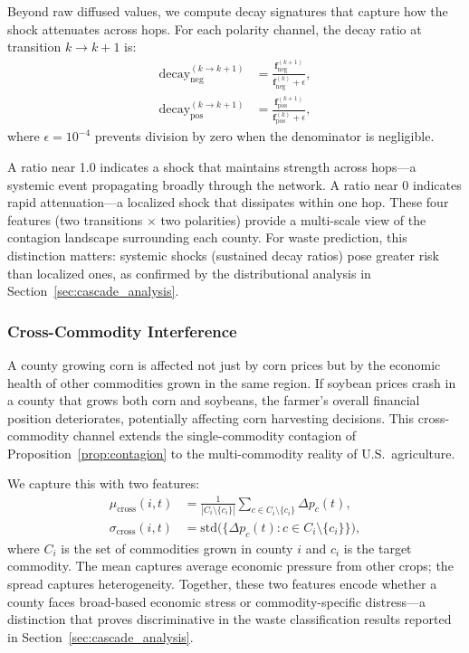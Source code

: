 \documentclass[preprint,12pt,authoryear]{elsarticle}
\begin{document}
Beyond raw diffused values, we compute decay signatures that capture how the shock attenuates across hops. For each polarity channel, the decay ratio at transition $k \to k{+}1$ is:
\begin{align}
    \text{decay}_{\text{neg}}^{(k \to k+1)} &= \frac{\mathbf{f}_{\text{neg}}^{(k+1)}}{\mathbf{f}_{\text{neg}}^{(k)} + \epsilon}, \label{eq:neg_decay}\\
    \text{decay}_{\text{pos}}^{(k \to k+1)} &= \frac{\mathbf{f}_{\text{pos}}^{(k+1)}}{\mathbf{f}_{\text{pos}}^{(k)} + \epsilon}, \label{eq:pos_decay}
\end{align}
where $\epsilon = 10^{-4}$ prevents division by zero when the denominator is negligible.

A ratio near 1.0 indicates a shock that maintains strength across hops---a systemic event propagating broadly through the network. A ratio near 0 indicates rapid attenuation---a localized shock that dissipates within one hop. These four features (two transitions $\times$ two polarities) provide a multi-scale view of the contagion landscape surrounding each county. For waste prediction, this distinction matters: systemic shocks (sustained decay ratios) pose greater risk than localized ones, as confirmed by the distributional analysis in Section~\ref{sec:cascade_analysis}.

\subsubsection{Cross-Commodity Interference}

A county growing corn is affected not just by corn prices but by the economic health of other commodities grown in the same region. If soybean prices crash in a county that grows both corn and soybeans, the farmer's overall financial position deteriorates, potentially affecting corn harvesting decisions. This cross-commodity channel extends the single-commodity contagion of Proposition~\ref{prop:contagion} to the multi-commodity reality of U.S.\ agriculture.

We capture this with two features:
\begin{align}
    \mu_{\text{cross}}(i, t) &= \frac{1}{|C_i \setminus \{c_i\}|} \sum_{c \in C_i \setminus \{c_i\}} \Delta p_c(t), \label{eq:cross_mean} \\
    \sigma_{\text{cross}}(i, t) &= \text{std}\bigl(\{\Delta p_c(t) : c \in C_i \setminus \{c_i\}\}\bigr), \label{eq:cross_spread}
\end{align}
where $C_i$ is the set of commodities grown in county $i$ and $c_i$ is the target commodity. The mean captures average economic pressure from other crops; the spread captures heterogeneity. Together, these two features encode whether a county faces broad-based economic stress or commodity-specific distress---a distinction that proves discriminative in the waste classification results reported in Section~\ref{sec:cascade_analysis}.
\end{document}
